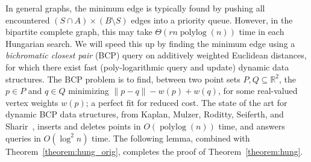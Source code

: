 \documentclass[11pt]{article}
\def\polylog{\mathop{\mathrm{polylog}}}
\theoremstyle{plain}
\begin{document}
In general graphs, the minimum edge is typically found by pushing all 
encountered $(S \cap A) \times (B \setminus S)$ edges into a priority queue.
However, in the bipartite complete graph, this may take $\Theta(rn\polylog(n))$
time in each Hungarian search.
We will speed this up by finding the minimum edge using a \emph{bichromatic 
closest pair} (BCP) query on additively weighted Euclidean distances,
for which there exist fast (poly-logarithmic query and update) dynamic data 
structures.
The BCP problem is to find, between two point sets 
$P, Q \subseteq \mathbb{R}^2$, the $p \in P$ and $q \in Q$ minimizing 
$\|p - q\| - w(p) + w(q)$, for some real-valued vertex weights $w(p)$;
a perfect fit for reduced cost.
The state of the art for dynamic BCP data structures, from Kaplan, Mulzer, 
Roditty, Seiferth, and Sharir~\cite{DBLP:conf/soda/KaplanMRSS17}, inserts and 
deletes points in $O(\polylog(n))$ time, and answers queries in $O(\log^2 n)$ 
time.
The following lemma, combined with Theorem~\ref{theorem:hung_orig}, completes
the proof of Theorem~\ref{theorem:hung}.
\end{document}
